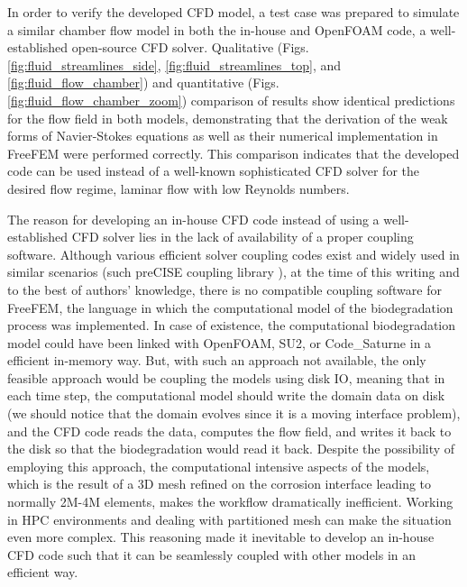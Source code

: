 In order to verify the developed CFD model, a test case was prepared to simulate a similar chamber flow model in both the in-house and OpenFOAM code, a well-established open-source CFD solver. Qualitative (Figs. \ref{fig:fluid_streamlines_side}, \ref{fig:fluid_streamlines_top}, and \ref{fig:fluid_flow_chamber}) and quantitative (Figs. \ref{fig:fluid_flow_chamber_zoom}) comparison of results show identical predictions for the flow field in both models, demonstrating that the derivation of the weak forms of Navier-Stokes equations as well as their numerical implementation in FreeFEM were performed correctly. This comparison indicates that the developed code can be used instead of a well-known sophisticated CFD solver for the desired flow regime, laminar flow with low Reynolds numbers.

The reason for developing an in-house CFD code instead of using a well-established CFD solver lies in the lack of availability of a proper coupling software. Although various efficient solver coupling codes exist and widely used in similar scenarios (such preCISE coupling library \cite{preCICEv2}), at the time of this writing and to the best of authors' knowledge, there is no compatible coupling software for FreeFEM, the language in which the computational model of the biodegradation process was implemented. In case of existence, the computational biodegradation model could have been linked with OpenFOAM, SU2, or Code\_Saturne in a efficient in-memory way. But, with such an approach not available, the only feasible approach would be coupling the models using disk IO, meaning that in each time step, the computational model should write the domain data on disk (we should notice that the domain evolves since it is a moving interface problem), and the CFD code reads the data, computes the flow field, and writes it back to the disk so that the biodegradation would read it back. Despite the possibility of employing this approach, the computational intensive aspects of the models, which is the result of a 3D mesh refined on the corrosion interface leading to normally 2M-4M elements, makes the workflow dramatically inefficient. Working in HPC environments and dealing with partitioned mesh can make the situation even more complex. This reasoning made it inevitable to develop an in-house CFD code such that it can be seamlessly coupled with other models in an efficient way.

